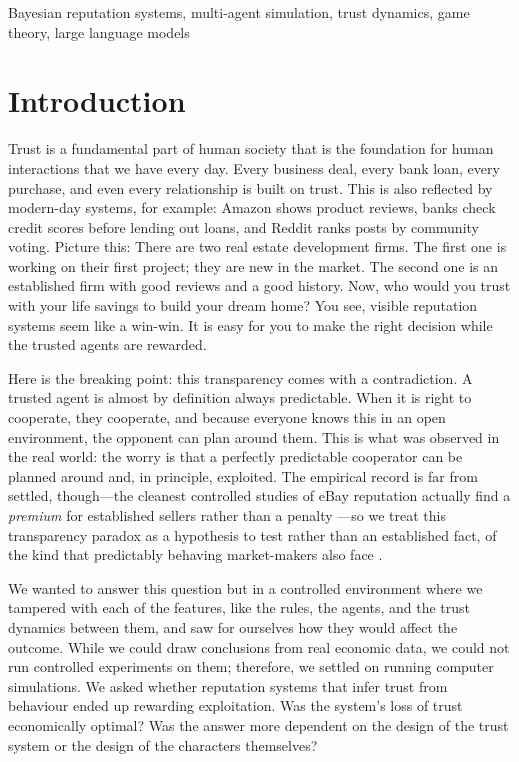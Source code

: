 \documentclass[journal]{IEEEtran}
\begin{document}
\begin{IEEEkeywords}
Bayesian reputation systems, multi-agent simulation, trust dynamics, game theory, large language models
\end{IEEEkeywords}

\section{Introduction}

Trust is a fundamental part of human society that is the
foundation for human interactions that we have every day. Every
business deal, every bank loan, every purchase, and even every
relationship is built on trust. This is also reflected by
modern-day systems, for example: Amazon shows product reviews,
banks check credit scores before lending out loans, and Reddit
ranks posts by community voting. Picture this: There are two real
estate development firms. The first one is working on their first
project; they are new in the market. The second one is an
established firm with good reviews and a good history. Now, who
would you trust with your life savings to build your dream home?
You see, visible reputation systems seem like a win-win. It is
easy for you to make the right decision while the trusted agents
are rewarded.

Here is the breaking point: this transparency comes with a
contradiction. A trusted agent is almost by definition always
predictable. When it is right to cooperate, they cooperate, and
because everyone knows this in an open environment, the opponent
can plan around them. This is what was observed in the real
world: the worry is that a perfectly predictable cooperator can be
planned around and, in principle, exploited. The empirical record is
far from settled, though---the cleanest controlled studies of eBay
reputation actually find a \emph{premium} for established sellers
rather than a penalty \citep{resnick2002trust,bolton2004effective}---so
we treat this transparency paradox as a hypothesis to test rather
than an established fact, of the kind that predictably behaving
market-makers also face \citep{glosten1985bid}.

We wanted to answer this question but in a controlled environment
where we tampered with each of the features, like the rules, the
agents, and the trust dynamics between them, and saw for ourselves
how they would affect the outcome. While we could draw conclusions
from real economic data, we could not run controlled experiments
on them; therefore, we settled on running computer simulations. We
asked whether reputation systems that infer trust from behaviour
ended up rewarding exploitation. Was the system's loss of trust
economically optimal? Was the answer more dependent on the design
of the trust system or the design of the characters themselves?
\end{document}
